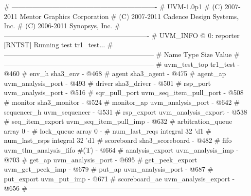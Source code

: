 \begin{center}
\begin{tcolorbox}

	\begin{verbbox}

# ----------------------------------------------------------------
# UVM-1.0p1 
# (C) 2007-2011 Mentor Graphics Corporation
# (C) 2007-2011 Cadence Design Systems, Inc.
# (C) 2006-2011 Synopsys, Inc.
# ----------------------------------------------------------------
# UVM_INFO @ 0: reporter [RNTST] Running test tr1_test...
# ------------------------------------------------------------------
# Name                       Type                        Size  Value
# ------------------------------------------------------------------
# uvm_test_top               tr1_test                    -     @460 
#   env_h                    sha3_env                    -     @468 
#     agent                  sha3_agent                  -     @475 
#       agent_ap             uvm_analysis_port           -     @493 
#       driver               sha3_driver                 -     @501 
#         rsp_port           uvm_analysis_port           -     @516 
#         sqr_pull_port      uvm_seq_item_pull_port      -     @508 
#       monitor              sha3_monitor                -     @524 
#         monitor_ap         uvm_analysis_port           -     @642 
#       sequencer_h          uvm_sequencer               -     @531 
#         rsp_export         uvm_analysis_export         -     @538 
#         seq_item_export    uvm_seq_item_pull_imp       -     @632 
#         arbitration_queue  array                       0     -    
#         lock_queue         array                       0     -    
#         num_last_reqs      integral                    32    'd1  
#         num_last_rsps      integral                    32    'd1  
#     scoreboard             sha3_scoreboard             -     @482 
#       fifo                 uvm_tlm_analysis_fifo #(T)  -     @664 
#         analysis_export    uvm_analysis_imp            -     @703 
#         get_ap             uvm_analysis_port           -     @695 
#         get_peek_export    uvm_get_peek_imp            -     @679 
#         put_ap             uvm_analysis_port           -     @687 
#         put_export         uvm_put_imp                 -     @671 
#       scoreboard_ae        uvm_analysis_export         -     @656 
# ------------------------------------------------------------------
	\end{verbbox}
	\resizebox{0.95\textwidth}{!}{\theverbbox}
	
\end{tcolorbox}
\end{center}


